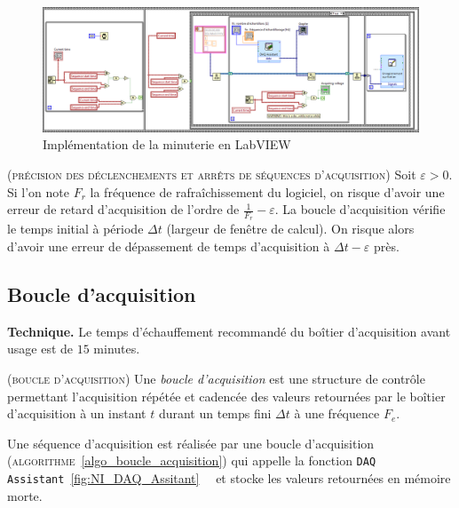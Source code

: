 \documentclass[twocolumn,pre,floats,aps,amsmath,amssymb]{revtex4}
\newenvironment{definition}[1][D\'efinition.]{\begin{trivlist}
\item[\hskip \labelsep {\bfseries #1}]}{\end{trivlist}}
\newenvironment{remark}[1][Remarque.]{\begin{trivlist}
\item[\hskip \labelsep {\bfseries #1}]}{\end{trivlist}}
\begin{document}
\begin{figure}[]
  \includegraphics[width=17.5cm]{pictures/minuterie.png}
\caption{Impl\'ementation de la minuterie en LabVIEW}
\label{fig:algo_timer_labview}
\end{figure}

\begin{remark}
  \textsc{(pr\'ecision des d\'eclenchements et arr\^ets de s\'equences d'acquisition)}
  Soit $\varepsilon > 0$.
  Si l'on note $F_r$ la fr\'equence de rafra\^ichissement du logiciel, on risque d'avoir une erreur de retard d'acquisition de l'ordre de $\frac{1}{F_r} - \varepsilon$. La boucle d'acquisition v\'erifie le temps initial \`a p\'eriode $\Delta t$ (largeur de fen\^etre de calcul). On risque alors d'avoir une erreur de d\'epassement de temps d'acquisition \`a $\Delta t - \varepsilon$ pr\`es. 
\end{remark}

\subsection{Boucle d'acquisition}

\noindent
\textbf{Technique.} Le temps d'\'echauffement recommand\'e du bo\^itier d'acquisition avant usage est de $15$ minutes\cite{NI_6353_datasheet}.

\begin{definition}
  (\textsc{boucle d'acquisition})
  Une \textit{boucle d'acquisition} est une structure de contr\^ole permettant l'acquisition r\'ep\'et\'ee et cadenc\'ee des valeurs retourn\'ees par le bo\^itier d'acquisition \`a un instant $t$ durant un temps fini $\Delta t$ \`a une fr\'equence $F_e$.
\end{definition}

Une s\'equence d'acquisition est r\'ealis\'ee par une boucle d'acquisition (\textsc{algorithme}~\ref{algo_boucle_acquisition}) qui appelle la fonction \texttt{DAQ Assistant}~\ref{fig:NI_DAQ_Assitant}~\cite{NI_acquisition_design_ref}~\cite{NI_Dynamic_data} et stocke les valeurs retourn\'ees en m\'emoire morte.
\end{document}

